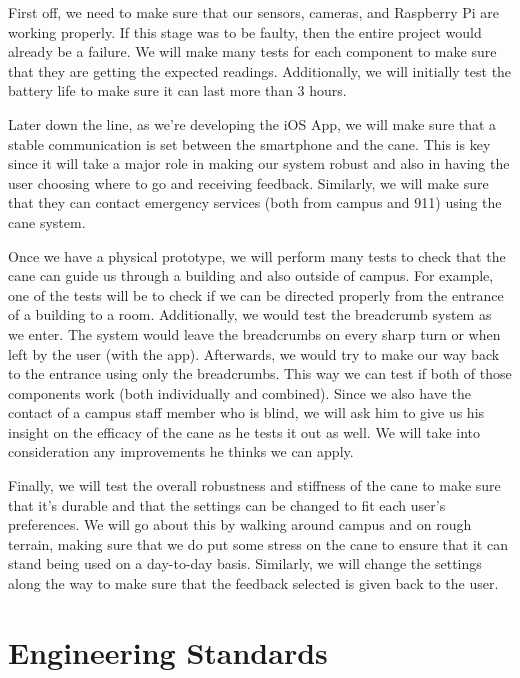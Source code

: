 \documentclass[letterpaper,12pt]{article}
\begin{document}
First off, we need to make sure that our sensors, cameras, and Raspberry Pi are working properly. If this stage was to be faulty, then the entire project would already be a failure. We will make many tests for each component to make sure that they are getting the expected readings. Additionally, we will initially test the battery life to make sure it can last more than 3 hours. \par

Later down the line, as we're developing the iOS App, we will make sure that a stable communication is set between the smartphone and the cane. This is key since it will take a major role in making our system robust and also in having the user choosing where to go and receiving feedback. Similarly, we will make sure that they can contact emergency services (both from campus and 911) using the cane system. \par

Once we have a physical prototype, we will perform many tests to check that the cane can guide us through a building and also outside of campus. For example, one of the tests will be to check if we can be directed properly from the entrance of a building to a room. Additionally, we would test the breadcrumb system as we enter. The system would leave the breadcrumbs on every sharp turn or when left by the user (with the app). Afterwards, we would try to make our way back to the entrance using only the breadcrumbs. This way we can test if both of those components work (both individually and combined). Since we also have the contact of a campus staff member who is blind, we will ask him to give us his insight on the efficacy of the cane as he tests it out as well. We will take into consideration any improvements he thinks we can apply. \par

Finally, we will test the overall robustness and stiffness of the cane to make sure that it's durable and that the settings can be changed to fit each user's preferences. We will go about this by walking around campus and on rough terrain, making sure that we do put some stress on the cane to ensure that it can stand being used on a day-to-day basis. Similarly, we will change the settings along the way to make sure that the feedback selected is given back to the user.



\section{Engineering Standards}
\end{document}
